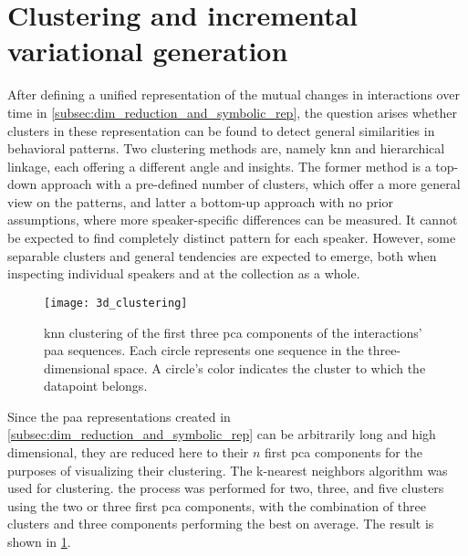 \section{Clustering and incremental variational generation}
\label{sec:clustering_and_incremental_generation}

After defining a unified representation of the mutual changes in interactions over time in \cref{subsec:dim_reduction_and_symbolic_rep}, the question arises whether clusters in these representation can be found to detect general similarities in behavioral patterns.
Two clustering methods are, namely \ac{knn} and hierarchical linkage, each offering a different angle and insights.
The former method is a top-down approach with a pre-defined number of clusters, which offer a more general view on the patterns, and latter a bottom-up approach with no prior assumptions, where more speaker-specific differences can be measured.
It cannot be expected to find completely distinct pattern for each speaker.
However, some separable clusters and general tendencies are expected to emerge, both when inspecting individual speakers and at the collection as a whole.

\begin{figure}[t]
	\centering
	\texttt{[image: 3d\_clustering]}
	\caption[3D \ac{knn} clustering of mutual changes \acs{pca} components]
		{\ac{knn} clustering of the first three \ac{pca} components of the interactions' \ac{paa} sequences.
		 Each circle represents one sequence in the three-dimensional space.
		 A circle's color indicates the cluster to which the datapoint belongs.}
	\label{fig:knn_clustering}
\end{figure}

Since the \ac{paa} representations created in \cref{subsec:dim_reduction_and_symbolic_rep} can be arbitrarily long and high dimensional, they are reduced here to their $n$ first \ac{pca} components for the purposes of visualizing their clustering.
The k-nearest neighbors algorithm was used for clustering.
the process was performed for two, three, and five clusters using the two or three first \ac{pca} components, with the combination of three clusters and three components performing the best on average.
The result is shown in \cref{fig:knn_clustering}.


